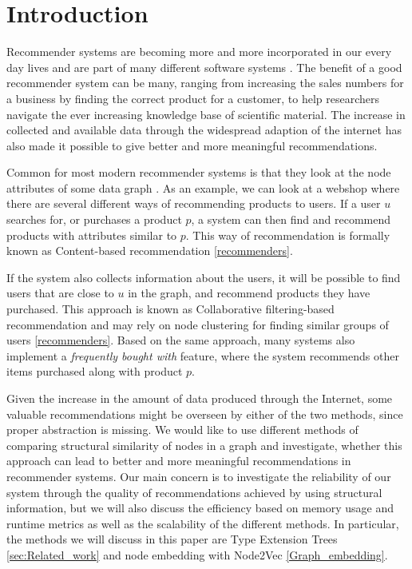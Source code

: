 \section{Introduction}
  Recommender systems are becoming more and more incorporated in our every day lives and are part of many different software systems \cite{recommender_e-comerce}. The benefit of a good recommender system can be many,  ranging from increasing the sales numbers for a business by finding the correct product for a customer, to help researchers navigate the ever increasing knowledge base of scientific material. The increase in collected and available data through the widespread adaption of the internet has also made it possible to give better and more meaningful recommendations.

  Common for most modern recommender systems is that they look at the node attributes of some data graph \cite{Ricci2015}. As an example, we can look at a webshop where there are several different ways of recommending products to users. If a user $u$ searches for, or purchases a product $p$, a system can then find and recommend products with attributes similar to $p$. This way of recommendation is formally known as Content-based recommendation \ref{recommenders}.

  If the system also collects information about the users, it will be possible to find users that are close to $u$ in the graph, and recommend products they have purchased. This approach is known as Collaborative filtering-based recommendation and may rely on node clustering for finding similar groups of users \ref{recommenders}. Based on the same approach, many systems also implement a \textit{frequently bought with} feature, where the system recommends other items purchased along with product $p$.

  Given the increase in the amount of data produced through the Internet, some valuable recommendations might be overseen by either of the two methods, since proper abstraction is missing. We would like to use different methods of comparing structural similarity of nodes in a graph and investigate, whether this approach can lead to better and more meaningful recommendations in recommender systems. Our main concern is to investigate the reliability of our system through the quality of recommendations achieved by using structural information, but we will also discuss the efficiency based on memory usage and runtime metrics as well as the scalability of the different methods. In particular, the methods we will discuss in this paper are Type Extension Trees \ref{sec:Related_work} and node embedding with Node2Vec \ref{Graph_embedding}.

